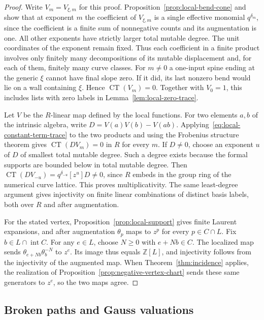 \documentclass[11pt,reqno]{amsart}
\numberwithin{equation}{section}
\theoremstyle{definition}
\theoremstyle{remark}
\begin{document}
\begin{proof}
Write \(V_m=V_{\xi,m}\) for this proof.
Proposition~\ref{prop:local-bend-cone} and \cite[Lemmas~20.31 and~20.34]{KY}
show that at exponent \(m\) the coefficient of \(V_{\xi,m}\) is
a single effective monomial \(q^{\delta_m}\), since the coefficient
is a finite sum of nonnegative counts and its augmentation is one. All other
exponents have strictly larger total mutable degree. The unit coordinates of the exponent remain fixed. Thus each coefficient in
a finite product involves only finitely many decompositions of its
mutable displacement and, for each of them, finitely many curve classes.
For \(m\ne0\) a one-input spine ending at the generic \(\xi\) cannot
have final slope zero. If it did, its last nonzero bend would lie on a
wall containing \(\xi\). Hence \(\operatorname{CT}(V_m)=0\).
Together with \(V_0=1\), this includes lists with zero labels in
Lemma~\ref{lem:local-zero-trace}.

Let \(V\) be the \(R\)-linear map defined by the local functions.
For two elements \(a,b\) of the intrinsic algebra, write
\(D=V(a)V(b)-V(ab)\). Applying~\eqref{eq:local-constant-term-trace} to the two products and using the
Frobenius structure theorem gives \(\operatorname{CT}(D V_m)=0\) in \(R\) for every \(m\). If \(D\ne0\), choose an exponent \(u\) of \(D\) of smallest total
mutable degree. Such a degree exists because the formal supports are bounded below in
total mutable degree. Then \(\operatorname{CT}(D V_{-u})=q^{\delta_{-u}}[z^u]D\ne0\),
since \(R\) embeds in the group ring of the numerical curve lattice.
This proves multiplicativity. The same least-degree argument gives
injectivity on finite linear combinations of distinct basis labels,
both over \(R\) and after augmentation.

For the stated vertex, Proposition~\ref{prop:local-support} gives
finite Laurent expansions, and after augmentation \(\theta_p\) maps
to \(z^p\) for every \(p\in C\cap L\). Fix \(b\in L\cap\operatorname{int}C\).
For any \(e\in L\), choose \(N\ge0\) with \(e+Nb\in C\). The
localized map sends \(\theta_{e+Nb}\theta_b^{-N}\) to \(z^e\).
Its image thus equals \(\mathbb Z[L]\), and injectivity follows from
the injectivity of the augmented map.
When Theorem~\ref{thm:incidence} applies, the realization of
Proposition~\ref{prop:negative-vertex-chart} sends these same
generators to \(z^e\), so the two maps agree.
\end{proof}

\subsection{Broken paths and Gauss valuations}
\label{subsec:path-vi}
\end{document}
